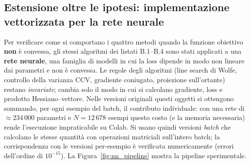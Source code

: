 \documentclass[italian, a4paper, twoside, binding=6mm]{sapthesis}
\begin{document}
\subsection{Estensione oltre le ipotesi: implementazione vettorizzata per la rete neurale}\label{sec:nsynth-net}

Per verificare come si comportano i quattro metodi quando la funzione obiettivo
\textbf{non} è convessa, gli stessi algoritmi dei listati B.1--B.4 sono stati
applicati a una \textbf{rete neurale}, una famiglia di modelli in cui la loss
dipende in modo non lineare dai parametri e non è convessa. Le regole degli
algoritmi (line search di Wolfe, controllo della varianza CCV, gradiente
coniugato, proiezione sull'ortante) restano \emph{invariate}; cambia solo il
modo in cui si calcolano gradiente, loss e prodotto Hessiano--vettore. Nelle
versioni originali questi oggetti si ottengono sommando, per ogni esempio del
batch, il contributo individuale: con una rete di $\approx 234\,000$ parametri
e $N = 12\,678$ esempi questo costo (e la memoria necessaria) rende
l'esecuzione impraticabile su Colab. Si usano quindi versioni \emph{batch} che
calcolano le stesse quantità con operazioni matriciali sull'intero batch; la
corrispondenza con le versioni per-esempio è verificata numericamente (errori
dell'ordine di $10^{-15}$). La Figura~\ref{fig:nn_pipeline} mostra la pipeline
sperimentale.
\end{document}
